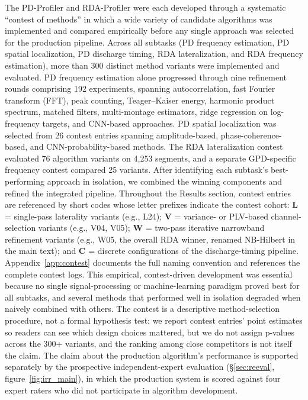 \documentclass{iopjournal}
\begin{document}
The PD-Profiler and RDA-Profiler were each developed through a systematic ``contest of methods'' in which a wide variety of candidate algorithms was implemented and compared empirically before any single approach was selected for the production pipeline. Across all subtasks (PD frequency estimation, PD spatial localization, PD discharge timing, RDA lateralization, and RDA frequency estimation), more than 300 distinct method variants were implemented and evaluated. PD frequency estimation alone progressed through nine refinement rounds comprising 192 experiments, spanning autocorrelation, fast Fourier transform (FFT), peak counting, Teager--Kaiser energy, harmonic product spectrum, matched filters, multi-montage estimators, ridge regression on log-frequency targets, and CNN-based approaches. PD spatial localization was selected from 26 contest entries spanning amplitude-based, phase-coherence-based, and CNN-probability-based methods. The RDA lateralization contest evaluated 76 algorithm variants on 4,253 segments, and a separate GPD-specific frequency contest compared 25 variants. After identifying each subtask's best-performing approach in isolation, we combined the winning components and refined the integrated pipeline. Throughout the Results section, contest entries are referenced by short codes whose letter prefixes indicate the contest cohort: \textbf{L} = single-pass laterality variants (e.g., L24); \textbf{V} = variance- or PLV-based channel-selection variants (e.g., V04, V05); \textbf{W} = two-pass iterative narrowband refinement variants (e.g., W05, the overall RDA winner, renamed NB-Hilbert in the main text); and \textbf{C} = discrete configurations of the discharge-timing pipeline. Appendix~\ref{app:contest} documents the full naming convention and references the complete contest logs. This empirical, contest-driven development was essential because no single signal-processing or machine-learning paradigm proved best for all subtasks, and several methods that performed well in isolation degraded when naively combined with others. The contest is a descriptive method-selection procedure, not a formal hypothesis test: we report contest entries' point estimates so readers can see which design choices mattered, but we do not assign p-values across the 300+ variants, and the ranking among close competitors is not itself the claim. The claim about the production algorithm's performance is supported separately by the prospective independent-expert evaluation (\S\ref{sec:reeval}, figure~\ref{fig:irr_main}), in which the production system is scored against four expert raters who did not participate in algorithm development.
\end{document}
